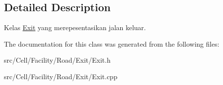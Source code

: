 \subsection{Detailed Description}
Kelas \hyperlink{classExit}{Exit} yang merepesentasikan jalan keluar. 

The documentation for this class was generated from the following files\+:\begin{DoxyCompactItemize}
\item 
src/\+Cell/\+Facility/\+Road/\+Exit/Exit.\+h\item 
src/\+Cell/\+Facility/\+Road/\+Exit/Exit.\+cpp\end{DoxyCompactItemize}
